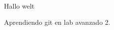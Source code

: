 \documentclass{article}
\begin{document}
Hallo welt

Aprendiendo git en lab avanzado 2. 
\end{document}
